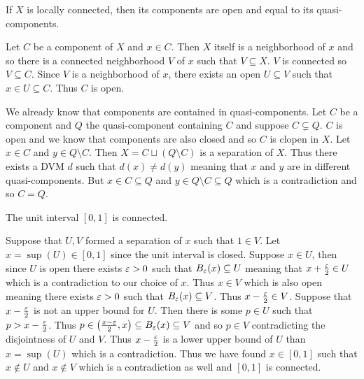 \documentclass[letterpaper, 11pt, oneside]{book}
\begin{document}
\begin{exercise}
  If $X$ is locally connected, then its components are open and equal to its quasi-components.
\end{exercise}
\begin{pf}
  Let $C$ be a component of $X$ and $x \in C$.
  Then $X$ itself is a neighborhood of $x$ and so there is a connected neighborhood $V$ of $x$ such that $V \subseteq X$.
  $V$ is connected so $V \subseteq C$.
  Since $V$ is a neighborhood of $x$, there exists an open $U \subseteq V$ such that $x \in U \subseteq C$.
  Thus $C$ is open.

  We already know that components are contained in quasi-components.
  Let $C$ be a component and $Q$ the quasi-component containing $C$ and suppose $C \subsetneq Q$.
  $C$ is open and we know that components are also closed and so $C$ is clopen in $X$.
  Let $x \in C$ and $y \in Q \setminus C$.
  Then $X = C \sqcup (Q \setminus C)$ is a separation of $X$.
  Thus there exists a DVM $d$ such that $d(x) \neq d(y)$ meaning that $x$ and $y$ are in different quasi-components.
  But $x \in C \subseteq Q$ and $y \in Q \setminus C \subseteq Q$ which is a contradiction and so $C = Q$.
\end{pf}

\begin{exercise}\label{exercise:unit_interval_connected}
  The unit interval $[0, 1]$ is connected.
\end{exercise}
\begin{pf}
  Suppose that $U, V$ formed a separation of $x$ such that $1 \in V$.
  Let $x = \sup(U) \in [0, 1]$ since the unit interval is closed.
  Suppose $x \in U$, then since $U$ is open there exists $\varepsilon > 0$ such that $B_{\varepsilon}(x) \subseteq U$ meaning that $x + \frac{\varepsilon}{2} \in U$ which is a contradiction to our choice of $x$.
  Thus $x \in V$ which is also open meaning there exists $\varepsilon > 0$ such that $B_{\varepsilon}(x) \subseteq V$.
  Thus $x - \frac{\varepsilon}{2} \in V$.
  Suppose that $x - \frac{\varepsilon}{2}$ is not an upper bound for $U$.
  Then there is some $p \in U$ such that $p > x - \frac{\varepsilon}{2}$.
  Thus $p \in \pqty{\frac{x - \e}{2}, x} \subseteq B_{\e}(x) \subseteq V$ and so $p \in V$ contradicting the disjointness of $U$ and $V$.
  Thus $x - \frac{\varepsilon}{2}$ is a lower upper bound of $U$ than $x = \sup(U)$ which is a contradiction.
  Thus we have found $x \in [0, 1]$ such that $x \notin U$ and $x \notin V$ which is a contradiction as well and $[0, 1]$ is connected.
\end{pf}
\end{document}
